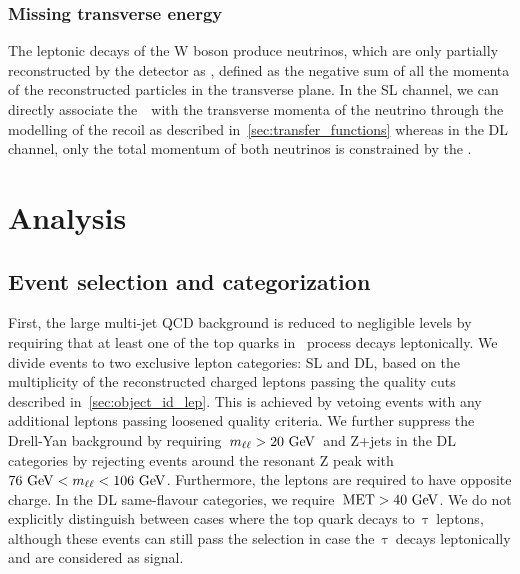 \subsubsection{Missing transverse energy}
The leptonic decays of the W boson produce neutrinos, which are only partially reconstructed by the detector as \MET, defined as the negative sum of all the momenta of the reconstructed particles in the transverse plane. In the SL channel, we can directly associate the~\MET~with the transverse momenta of the neutrino through the modelling of the recoil as described in~\cref{sec:transfer_functions} whereas in the DL channel, only the total momentum of both neutrinos is constrained by the \MET.

\section{Analysis}
\label{sec:analysis}
\subsection{Event selection and categorization}
\label{sec:event_selection}

First, the large multi-jet QCD background is reduced to negligible levels by requiring that at least one of the top quarks in~\ttHbb\xspace process decays leptonically. We divide events to two exclusive lepton categories: SL and DL, based on the multiplicity of the reconstructed charged leptons passing the quality cuts described in~\cref{sec:object_id_lep}. This is achieved by vetoing events with any additional leptons passing loosened quality criteria. We further suppress the Drell-Yan background by requiring~$m_{\ell\ell} > 20~\mathrm{GeV}$~and Z+jets in the DL categories by rejecting events around the resonant Z peak with~$76~\mathrm{GeV} < m_{\ell\ell} < 106~\mathrm{GeV}$. Furthermore, the leptons are required to have opposite charge. In the DL same-flavour categories, we require~$\mathrm{MET} > 40~\mathrm{GeV}$. We do not explicitly distinguish between cases where the top quark decays to~$\mathrm{\tau}$~leptons, although these events can still pass the selection in case the~$\mathrm{\tau}$~decays leptonically and are considered as signal.

